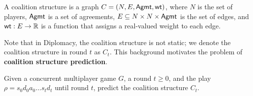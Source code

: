 
\begin{definition}
	A coalition structure is a graph $C = (N, E, \mathsf{Agmt}, \mathsf{wt})$, where $N$ is the set of players, $\mathsf{Agmt}$ is a set of agreements, $E \subseteq N \times N \times \mathsf{Agmt}$ is the set of edges, and $\mathsf{wt}: E \rightarrow \mathbb{R}$ is a function that assigns a real-valued weight to each edge. 
\end{definition}

Note that in Diplomacy, the coalition structure is not static; we denote the coalition structure in round $t$ as $C_t$. This background motivates the problem of \textbf{coalition structure prediction}. 
\begin{problem}\label{eq:problem}
	Given a concurrent multiplayer game $G$, a round $t \geq 0$, and the play $\rho = s_0 d_0 a_0 \ldots s_t d_t$ until round $t$, predict the coalition structure $C_t$. 
\end{problem}	


